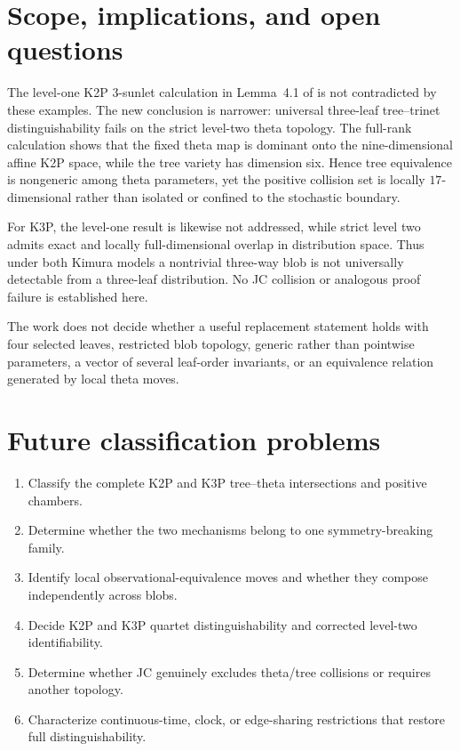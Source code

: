 \documentclass[11pt]{article}
\theoremstyle{remark}\newtheorem{remark}[theorem]{Remark}
\begin{document}
\section{Scope, implications, and open questions}\label{sec:landscape}
The level-one K2P 3-sunlet calculation in Lemma~4.1 of \cite{BritsHoltgrefeVanIerselMartin2026} is not contradicted by these examples. The new conclusion is narrower: universal three-leaf tree--trinet distinguishability fails on the strict level-two theta topology. The full-rank calculation shows that the fixed theta map is dominant onto the nine-dimensional affine K2P space, while the tree variety has dimension six. Hence tree equivalence is nongeneric among theta parameters, yet the positive collision set is locally $17$-dimensional rather than isolated or confined to the stochastic boundary.

For K3P, the level-one result is likewise not addressed, while strict level two admits exact and locally full-dimensional overlap in distribution space. Thus under both Kimura models a nontrivial three-way blob is not universally detectable from a three-leaf distribution. No JC collision or analogous proof failure is established here.

The work does not decide whether a useful replacement statement holds with four selected leaves, restricted blob topology, generic rather than pointwise parameters, a vector of several leaf-order invariants, or an equivalence relation generated by local theta moves.

\section{Future classification problems}
\begin{enumerate}
\item Classify the complete K2P and K3P tree--theta intersections and positive chambers.
\item Determine whether the two mechanisms belong to one symmetry-breaking family.
\item Identify local observational-equivalence moves and whether they compose independently across blobs.
\item Decide K2P and K3P quartet distinguishability and corrected level-two identifiability.
\item Determine whether JC genuinely excludes theta/tree collisions or requires another topology.
\item Characterize continuous-time, clock, or edge-sharing restrictions that restore full distinguishability.
\end{enumerate}
\end{document}
